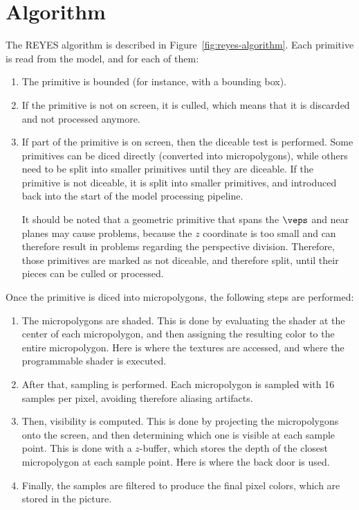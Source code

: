 \section{Algorithm}
The REYES algorithm is described in Figure~\ref{fig:reyes-algorithm}. Each primitive is read from the model, and for each of them:
\begin{enumerate}
    \item The primitive is bounded (for instance, with a bounding box).
    \item If the primitive is not on screen, it is culled, which means that it is discarded and not processed anymore.
    \item If part of the primitive is on screen, then the diceable test is performed. Some primitives can be diced directly (converted into micropolygons), while others need to be split into smaller primitives until they are diceable. If the primitive is not diceable, it is split into smaller primitives, and introduced back into the start of the model processing pipeline.
    
    It should be noted that a geometric primitive that spans the $\veps$ and near planes may cause problems, because the $z$ coordinate is too small and can therefore result in problems regarding the perspective division. Therefore, those primitives are marked as not diceable, and therefore split, until their pieces can be culled or processed.
\end{enumerate}

Once the primitive is diced into micropolygons, the following steps are performed:
\begin{enumerate}
    \item The micropolygons are shaded. This is done by evaluating the shader at the center of each micropolygon, and then assigning the resulting color to the entire micropolygon. Here is where the textures are accessed, and where the programmable shader is executed.
    \item After that, sampling is performed. Each micropolygon is sampled with 16 samples per pixel, avoiding therefore aliasing artifacts.
    \item Then, visibility is computed. This is done by projecting the micropolygons onto the screen, and then determining which one is visible at each sample point. This is done with a $z$-buffer, which stores the depth of the closest micropolygon at each sample point. Here is where the back door is used.
    \item Finally, the samples are filtered to produce the final pixel colors, which are stored in the picture.
\end{enumerate}

